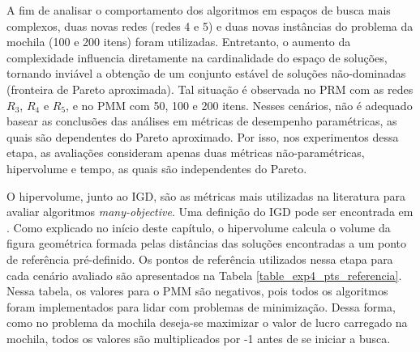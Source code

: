 A fim de analisar o comportamento dos algoritmos em espaços de busca mais complexos, duas novas redes (redes 4 e 5) e duas novas instâncias do problema da mochila (100 e 200 itens) foram utilizadas. Entretanto, o aumento da complexidade influencia diretamente na cardinalidade do espaço de soluções, tornando inviável a obtenção de um conjunto estável de soluções não-dominadas (fronteira de Pareto aproximada). Tal situação é observada no PRM com as redes $R_3$, $R_4$ e $R_5$, e no PMM com 50, 100 e 200 itens. Nesses cenários, não é adequado basear as conclusões das análises em métricas de desempenho paramétricas, as quais são dependentes do Pareto aproximado. Por isso, nos experimentos dessa etapa, as avaliações consideram apenas duas métricas não-paramétricas, hipervolume e tempo, as quais são independentes do Pareto.

O hipervolume, junto ao \ac{IGD}, são as métricas mais utilizadas na literatura para avaliar algoritmos \textit{many-objective}. Uma definição do IGD pode ser encontrada em \cite{IGD}. Como explicado no início deste capítulo, o hipervolume calcula o volume da figura geométrica formada pelas distâncias das soluções encontradas a um ponto de referência pré-definido. Os pontos de referência utilizados nessa etapa para cada cenário avaliado são apresentados na Tabela \ref{table_exp4_pts_referencia}. Nessa tabela, os valores para o PMM são negativos, pois todos os algoritmos foram implementados para lidar com problemas de minimização. Dessa forma, como no problema da mochila deseja-se maximizar o valor de lucro carregado na mochila, todos os valores são multiplicados por -1 antes de se iniciar a busca.

